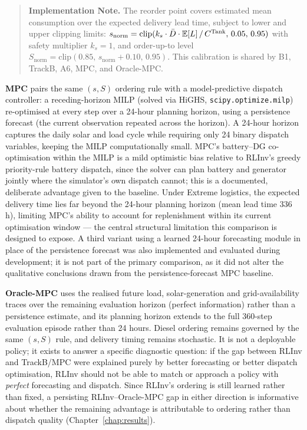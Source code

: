 \begin{quote}
\textbf{Implementation Note.} The reorder point covers estimated mean
consumption over the expected delivery lead time, subject to lower and
upper clipping limits:
$s_{\mathrm{norm}} = \mathrm{clip}(k_s \cdot \bar{D} \cdot \mathbb{E}[L]
\,/\, C^{\mathrm{Tank}},\, 0.05,\,0.95)$ with safety multiplier $k_s=1$, and
order-up-to level $S_{\mathrm{norm}} = \mathrm{clip}(0.85,\,
s_{\mathrm{norm}}+0.10,\,0.95)$. This calibration is shared by B1,
TrackB, A6, MPC, and Oracle-MPC.
\end{quote}

\textbf{MPC} pairs the same $(s,S)$ ordering rule with a model-predictive
dispatch controller: a receding-horizon MILP (solved via HiGHS,
\texttt{scipy.optimize.milp}) re-optimised at every step over a
24-hour planning horizon, using a persistence forecast (the current
observation repeated across the horizon). A 24-hour horizon captures the
daily solar and load cycle while requiring only 24 binary dispatch
variables, keeping the MILP computationally small. MPC's battery--DG
co-optimisation within the MILP is a mild optimistic bias relative to
RLInv's greedy priority-rule battery dispatch, since the solver can plan
battery and generator jointly where the simulator's own dispatch cannot;
this is a documented, deliberate advantage given to the baseline. Under
Extreme logistics, the expected delivery time lies far beyond the
24-hour planning horizon (mean lead time 336\,h), limiting MPC's ability
to account for replenishment within its current optimisation window ---
the central structural limitation this comparison is designed to expose. A
third variant using a learned 24-hour forecasting module in place of the
persistence forecast was also implemented and evaluated during
development; it is not part of the primary comparison, as it did not
alter the qualitative conclusions drawn from the persistence-forecast
MPC baseline.

\textbf{Oracle-MPC} uses the realised future load, solar-generation and
grid-availability traces over the remaining evaluation horizon (perfect
information) rather than a persistence estimate, and its planning
horizon extends to the full 360-step evaluation episode rather than 24
hours. Diesel ordering remains governed by the same $(s,S)$ rule, and
delivery timing remains stochastic. It is not a
deployable policy; it exists to answer a specific diagnostic question: if
the gap between RLInv and TrackB/MPC were explained purely by better
forecasting or better dispatch optimisation, RLInv should not be able to
match or approach a policy with \emph{perfect} forecasting and dispatch.
Since RLInv's ordering is still learned rather than fixed, a persisting
RLInv--Oracle-MPC gap in either direction is informative about whether
the remaining advantage is attributable to ordering rather than dispatch
quality (Chapter~\ref{chap:results}).

